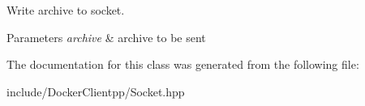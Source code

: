 Write archive to socket. 


\begin{DoxyParams}{Parameters}
{\em archive} & archive to be sent \\
\hline
\end{DoxyParams}


The documentation for this class was generated from the following file\+:\begin{DoxyCompactItemize}
\item 
include/\+Docker\+Clientpp/Socket.\+hpp\end{DoxyCompactItemize}
